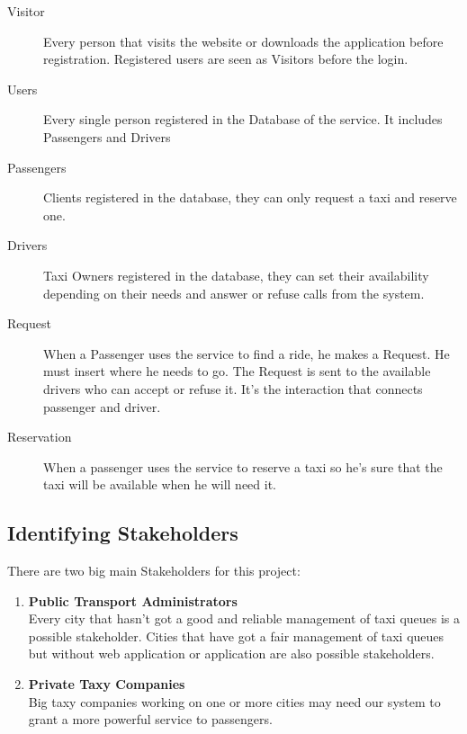 \begin{description}
	\item[Visitor] Every person that visits the website or downloads the application before registration. Registered users are seen as Visitors before the login.
	\item[Users] Every single person registered in the Database of the service. It includes Passengers and Drivers
	\item[Passengers] Clients registered in the database, they can only request a taxi and reserve one.  
	\item[Drivers]	Taxi Owners registered in the database, they can set their availability depending on their needs and answer or refuse calls from the system.
	\item[Request] When a Passenger uses the service to find a ride, he makes a Request. He must insert where he needs to go. The Request is sent to the available drivers who can accept or refuse it. It's the interaction that connects passenger and driver. 
	\item[Reservation] When a passenger uses the service to reserve a taxi so he's sure that the taxi will be available when he will need it.
	
\end{description}

\subsection{Identifying Stakeholders}

There are two big main Stakeholders for this project:
\begin{enumerate}
	\item \textbf{Public Transport Administrators} \\
	Every city that hasn't got a good and reliable management of taxi queues is a possible stakeholder.  Cities that have got a fair management of taxi queues but without web application or application are also possible stakeholders.
	\item \textbf{Private Taxy Companies} \\
	Big taxy companies working on one or more cities may need our system to grant a more powerful service to passengers.
\end{enumerate}	